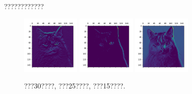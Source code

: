 \documentclass[lang=cn,11pt]{elegantpaper}
\begin{document}
\noindent ????????????
\begin{figure}[h]
\centering
  \includegraphics[width=0.25\textwidth]{30.png}
  \includegraphics[width=0.25\textwidth]{25}
  \includegraphics[width=0.25\textwidth]{15}
  \caption{???30????, ???25????, ???15????.}
\end{figure}
\end{document}
